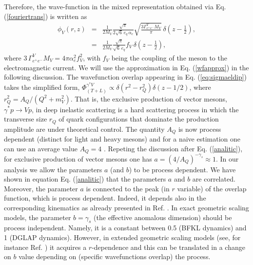 \documentclass[twocolumn,showpacs,preprintnumbers,amsmath,amssymb,showkeys,aps,prd,a4paper,byrevtex]{revtex4}
\begin{document}
Therefore, the wave-function in the mixed representation obtained via
Eq. (\ref{fouriertrans}) is written as
\begin{eqnarray}
\phi_V(r,z) & = & \frac{1}{2 M_V} \frac{\sqrt{\pi}}{2\sqrt{6}\, e_q\,
\alpha_e}\sqrt{\frac{3\Gamma^{V}_{e^+e^-} M_V}{\pi}} \,\delta \left(z-\frac{1}{2}\right),\nonumber \\
& = & \frac{1}{2 M_V} \frac{\sqrt{\pi}}{\sqrt{6}\, e_q} f_V\,\delta \left(z-\frac{1}{2}\right),
\label{wfapprox}
\end{eqnarray}
where $3\,\Gamma^{V}_{e^+e^-} M_V = 4\pi \alpha_e^2f_V^2$, with $f_V$ being the coupling of the meson to the electromagnetic current. We will use the approximation in Eq. (\ref{wfapprox}) in the following discussion. The wavefunction overlap appearing in Eq. (\ref{eq:sigmaeldip}) takes the simplified form, $\Phi_{(T+L)}^{\gamma^*V} \propto \delta (r^2-r_Q^2)\delta (z-1/2)$, where $r_Q^2 = A_Q/(Q^2+m_V^2)$. That is, the exclusive production of vector mesons, $\gamma^*p\rightarrow Vp$, in deep inelastic scattering is a hard scattering process in which the transverse size $r_Q$ of quark configurations that dominate the production amplitude are under theoretical control.  The quantity $A_Q$ is now process dependent (distinct for light and heavy mesons) \cite{KNNZ} and for a naive estimation one can use an average value $A_Q=4$ \cite{KNNZ}. Repeting the discussion after Eq. (\ref{analitic}), for exclusive production of vector mesons one has $a=(4/A_Q)^{-\gamma_s}\approx 1$. In our analysis we allow the parameters $a$ (and $b$) to be  process dependent. We have shown in equation Eq. (\ref{analitic}) that the parameters $a$ and $b$ are correlated. Moreover, the parameter $a$ is connected to the peak (in $r$ variable) of the overlap function, which is process dependent. Indeed,  it depends also in the corresponding kinematics as already presented in Ref. \cite{KNNZ}.  In exact geometric scaling models, the parameter $b=\gamma_s$ (the effective anomalous dimension) should be process independent. Namely, it is a constant between 0.5 (BFKL dynamics) and  1 (DGLAP dynamics). However, in extended geometric scaling models (see, for instance Ref. \cite{Iancu:2002tr}) it acquires a $r$-dependence and this can be translated in a change on $b$ value depending on (specific wavefunctions overlap) the process.
\end{document}
